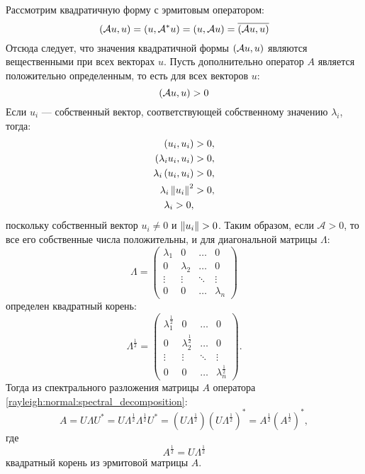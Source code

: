 Рассмотрим квадратичную форму с эрмитовым оператором:
\[
    \left ( \mathcal{A} u, u \right )
    = \left ( u, \mathcal{A}^* u \right )
    = \left ( u, \mathcal{A} u \right )
    = \overline{\left ( \mathcal{A} u, u \right )}
\]
Отсюда следует, что значения квадратичной формы $\left ( \mathcal{A} u, u \right )$ являются вещественными при всех векторах $u$. Пусть дополнительно оператор $A$
является положительно определенным, то есть для всех векторов $u$:
\[
    \left ( \mathcal{A} u, u \right ) > 0
\]
Если $u_i$ --- собственный вектор, соответствующей собственному значению $\lambda_i$, тогда:
\begin{align*}
    \left ( u_i, u_i \right ) & > 0 , \\
    \left ( \lambda_i u_i, u_i \right ) & > 0 , \\
    \lambda_i \left ( u_i, u_i \right ) & > 0 , \\
    \lambda_i \left \| u_i \right \|^2 & > 0 , \\
    \lambda_i > 0 ,
\end{align*}
поскольку собственный вектор $u_i \neq 0$ и $\left \| u_i \right \| > 0$. Таким образом, если $\mathcal{A} > 0$, то все его собственные числа положительны, и для диагональной
матрицы $\Lambda$:
\[
    \Lambda
    = \begin{pmatrix}
          \lambda_1 & 0         & \dots  & 0         \\
          0         & \lambda_2 & \dots  & 0         \\
          \vdots    & \vdots    & \ddots & \vdots    \\
          0         & 0         & \dots  & \lambda_n
    \end{pmatrix}
\]
определен квадратный корень:
\[
    \Lambda^\frac{1}{2}
    = \begin{pmatrix}
          \lambda_1^\frac{1}{2} & 0                     & \dots  & 0                     \\
          0                     & \lambda_2^\frac{1}{2} & \dots  & 0                     \\
          \vdots                & \vdots                & \ddots & \vdots                \\
          0                     & 0                     & \dots  & \lambda_n^\frac{1}{2}
    \end{pmatrix}
    .
\]
Тогда из спектрального разложения матрицы $A$ оператора \eqref{rayleigh:normal:spectral_decomposition}:
\[
    A
    = U \Lambda U^*
    = U \Lambda^\frac{1}{2} \Lambda^\frac{1}{2} U^*
    = \left ( U \Lambda^\frac{1}{2} \right ) \left ( U \Lambda^\frac{1}{2} \right )^*
    = A^\frac{1}{2} \left ( A^\frac{1}{2} \right )^*,
\]
где
\[
    A^\frac{1}{2} = U \Lambda^\frac{1}{2}
\]
квадратный корень из эрмитовой матрицы $A$.

